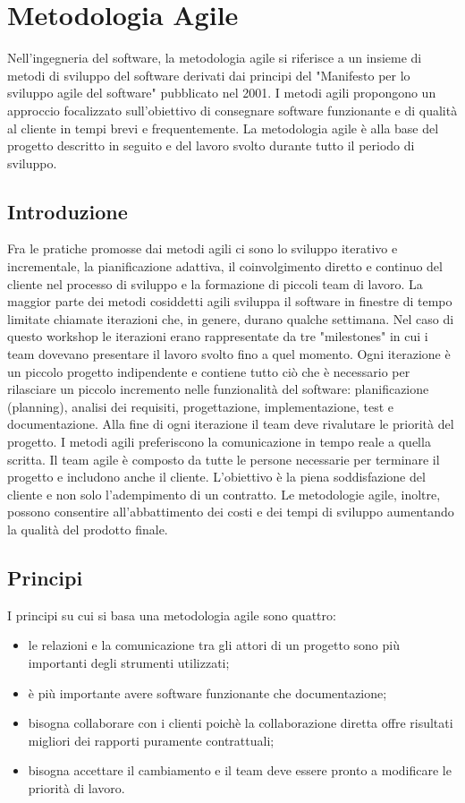 \chapter{Metodologia Agile}
Nell'ingegneria del software, la metodologia agile si riferisce a un insieme di metodi di sviluppo del software derivati dai principi del "Manifesto per lo sviluppo agile del software" pubblicato nel 2001. I metodi agili propongono un approccio focalizzato sull'obiettivo di consegnare software funzionante e di qualità al cliente  in tempi brevi e frequentemente.
La metodologia agile è alla base del progetto descritto in seguito e del lavoro svolto durante tutto il periodo di sviluppo.

\section{Introduzione}
Fra le pratiche promosse dai metodi agili ci sono lo sviluppo iterativo e incrementale, la pianificazione adattiva, il coinvolgimento diretto e continuo del cliente nel processo di sviluppo e la formazione di piccoli team di lavoro.
La maggior parte dei metodi cosiddetti agili sviluppa il software in finestre di tempo limitate chiamate iterazioni che, in genere, durano qualche settimana. Nel caso di questo workshop le iterazioni erano rappresentate da tre "milestones" in cui i team dovevano presentare il lavoro svolto fino a quel momento. Ogni iterazione è un piccolo progetto indipendente e contiene tutto ciò che è necessario per rilasciare un piccolo incremento nelle funzionalità del software: planificazione (planning), analisi dei requisiti, progettazione, implementazione, test e documentazione. Alla fine di ogni iterazione il team deve rivalutare le priorità del progetto.
I metodi agili preferiscono la comunicazione in tempo reale a quella scritta.
Il team agile è composto da tutte le persone necessarie per terminare il progetto e includono anche il cliente.
L'obiettivo è la piena soddisfazione del cliente e non solo l'adempimento di un contratto. Le metodologie agile, inoltre, possono consentire all'abbattimento dei costi e dei tempi di sviluppo aumentando la qualità del prodotto finale.

\section{Principi}
I principi su cui si basa una metodologia agile sono quattro:
\begin{itemize}
\item le relazioni e la comunicazione tra gli attori di un progetto sono più importanti degli strumenti utilizzati;
\item è più importante avere software funzionante che documentazione;
\item bisogna collaborare con i clienti poichè la collaborazione diretta offre risultati migliori dei rapporti puramente contrattuali;
\item bisogna accettare il cambiamento e il team deve essere pronto a modificare le priorità di lavoro.
\end{itemize}


